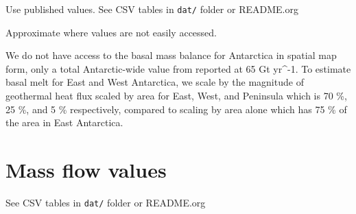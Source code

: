 \documentclass[review,jog]{igs}
\begin{document}
Use published values. See CSV tables in \texttt{dat/} folder or README.org

Approximate where values are not easily accessed.

We do not have access to the basal mass balance for Antarctica in spatial map form, only a total Antarctic-wide value from \citet{pattyn_2010} reported at 65 Gt yr^{-1}. To estimate basal melt for East and West Antarctica, we scale by the magnitude of geothermal heat flux scaled by area for East, West, and Peninsula which is 70 \%, 25 \%, and 5 \% respectively, compared to scaling by area alone which has 75 \% of the area in East Antarctica.

\section{Mass flow values}

See CSV tables in \texttt{dat/} folder or README.org

      
      

\end{document}
